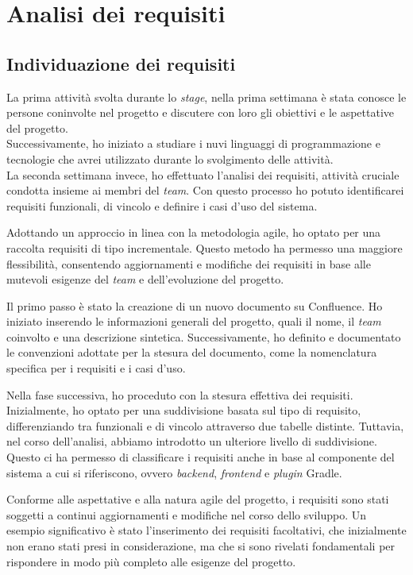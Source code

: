 \section{Analisi dei requisiti}
\subsection*{Individuazione dei requisiti}
La prima attività svolta durante lo \textit{stage}, nella prima settimana è stata conosce le persone coninvolte nel progetto e
discutere con loro gli obiettivi e le aspettative del progetto.\\
Successivamente, ho iniziato a studiare i nuvi linguaggi di programmazione e tecnologie che avrei utilizzato durante lo svolgimento delle attività.\\
La seconda settimana invece, ho effettuato l'analisi dei requisiti, attività cruciale condotta 
insieme ai membri del \textit{team}. Con questo processo ho potuto identificarei requisiti 
funzionali, di vincolo e definire i casi d'uso del sistema.

Adottando un approccio in linea con la metodologia agile, ho optato per una raccolta requisiti di tipo incrementale. 
Questo metodo ha permesso una maggiore flessibilità, consentendo aggiornamenti e modifiche dei requisiti in base alle 
mutevoli esigenze del \textit{team} e dell'evoluzione del progetto.

Il primo passo è stato la creazione di un nuovo documento su Confluence. Ho iniziato inserendo le informazioni 
generali del progetto, quali il nome, il \textit{team} coinvolto e una descrizione sintetica. Successivamente, 
ho definito e documentato le convenzioni adottate per la stesura del documento, come la nomenclatura specifica per 
i requisiti e i casi d'uso.

Nella fase successiva, ho proceduto con la stesura effettiva dei requisiti. Inizialmente, ho optato per una 
suddivisione basata sul tipo di requisito, differenziando tra funzionali e di vincolo attraverso due tabelle distinte. 
Tuttavia, nel corso dell'analisi, abbiamo introdotto un ulteriore livello di suddivisione. Questo ci ha permesso di 
classificare i requisiti anche in base al componente del sistema a cui si riferiscono, ovvero \textit{backend}, 
\textit{frontend} e \textit{plugin} Gradle.

Conforme alle aspettative e alla natura agile del progetto, i requisiti sono stati soggetti a continui aggiornamenti 
e modifiche nel corso dello sviluppo. Un esempio significativo è stato l'inserimento dei requisiti facoltativi, 
che inizialmente non erano stati presi in considerazione, ma che si sono rivelati fondamentali per rispondere in 
modo più completo alle esigenze del progetto.

